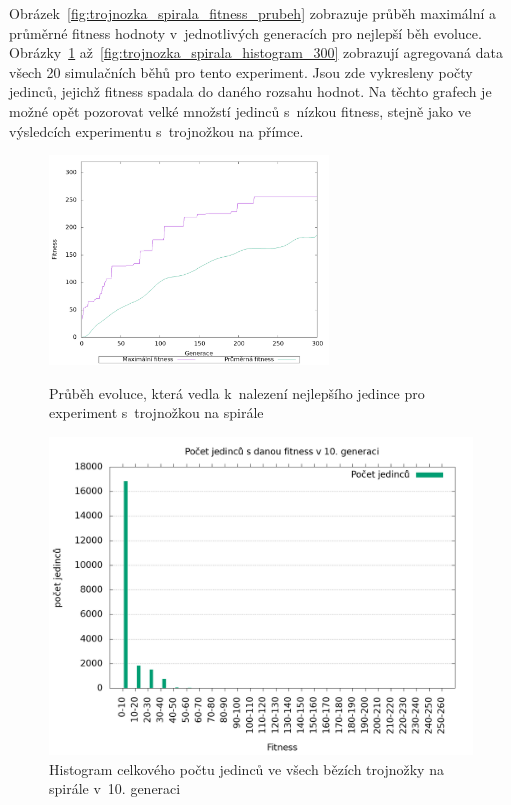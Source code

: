 Obrázek~\ref{fig:trojnozka_spirala_fitness_prubeh} zobrazuje průběh maximální a průměrné fitness hodnoty v~jednotlivých generacích pro nejlepší běh evoluce.
Obrázky~\ref{fig:trojnozka_spirala_histogram_10} až~\ref{fig:trojnozka_spirala_histogram_300} zobrazují agregovaná data všech 20 simulačních běhů pro tento experiment.
Jsou zde vykresleny počty jedinců, jejichž fitness spadala do daného rozsahu hodnot.
Na těchto grafech je možné opět pozorovat velké množstí jedinců s~nízkou fitness, stejně jako ve výsledcích experimentu s~trojnožkou na přímce.

\begin{figure}[h]
    \begin{minipage}[c]{0.48\linewidth}
    {\includegraphics[width=20em]{obrazky/trojnozka_spirala_fitness_prubeh.png}}
        \caption{
        Průběh evoluce, která vedla k~nalezení nejlepšího jedince pro experiment s~trojnožkou na spirále
        }
        \label{fig:trojnozka_spirala_fitness_prubeh}

    \end{minipage}
    \hfill
    \begin{minipage}[c]{0.48\linewidth}
        \includegraphics[width=\linewidth]{obrazky/trojnozka_spirala_fitnessHistogram10.png}
        \caption{Histogram celkového počtu jedinců ve všech bězích trojnožky na spirále v~10. generaci}
        \label{fig:trojnozka_spirala_histogram_10}
    \end{minipage}
\end{figure}

